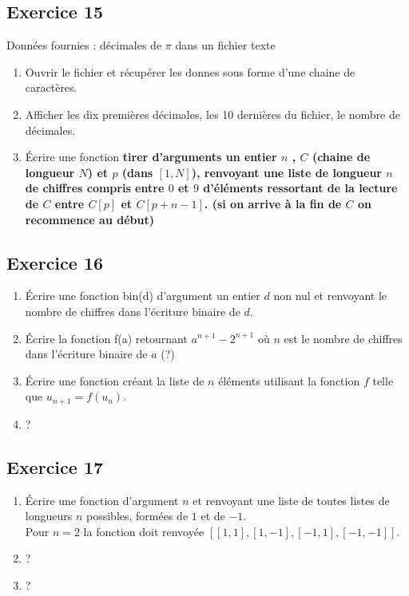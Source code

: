 \documentclass[10pt,fleqn]{article} %
\begin{document}
\begin{multicols}{2}
\subsection*{Exercice 15}
Données fournies : décimales de $\pi$ dans un fichier texte
\begin{enumerate}
\item Ouvrir le fichier et récupérer les donnes sous forme d'une chaine de caractères.
\item Afficher les dix premières décimales, les 10 dernières du fichier, 
le nombre de décimales.
\item Écrire une fonction \bf tirer \rm d'arguments un entier $n$ , $C$ (chaine de
 longueur $N$) et $p$ (dans $[1,N]$), renvoyant une liste de longueur $n$ de chiffres 
compris entre $0$ et $9$ d'éléments ressortant de la lecture de $C$ entre 
$C[p]$ et $C[p+n-1]$. (si on arrive à la fin de $C$ on recommence au début)
\end{enumerate}

\subsection*{Exercice 16}
\begin{enumerate}
 \item Écrire une fonction bin(d) d'argument un entier $d$ non nul et renvoyant 
 le nombre de  chiffres dans l'écriture binaire de $d$.
 \item Écrire la fonction f(a) retournant $a^{n+1}-2^{n+1}$ où $n$ est le nombre de chiffres dans l'écriture binaire de $a$ (?)
\item Écrire une fonction créant la liste de $n$ éléments utilisant la fonction 
$f$ telle que $u_{n+1}=f(u_n)$. %
\item ?\\
 \end{enumerate}


\subsection*{Exercice 17}
\begin{enumerate}
\item Écrire une fonction d'argument $n$ et renvoyant une liste de toutes listes de longueurs $n$ possibles, formées de $1$ et de $-1$.\\
Pour $n=2$ la fonction doit renvoyée $[[1,1],[1,-1],[-1,1],[-1,-1]]$.
\item ?
\item ?
\end{enumerate}


\end{multicols}
\end{document}

